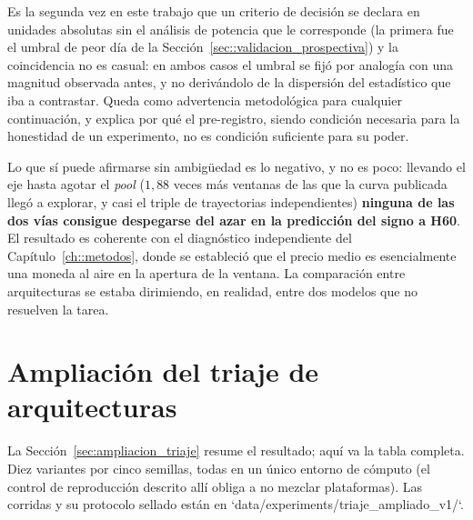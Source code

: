 Es la segunda vez en este trabajo que un criterio de decisión se declara en unidades
absolutas sin el análisis de potencia que le corresponde (la primera fue el umbral de peor
día de la Sección~\ref{sec::validacion_prospectiva}) y la coincidencia no es casual: en
ambos casos el umbral se fijó por analogía con una magnitud observada antes, y no
derivándolo de la dispersión del estadístico que iba a contrastar. Queda como advertencia
metodológica para cualquier continuación, y explica por qué el pre-registro, siendo
condición necesaria para la honestidad de un experimento, no es condición suficiente para
su poder.

Lo que sí puede afirmarse sin ambigüedad es lo negativo, y no es poco: llevando el eje
hasta agotar el \emph{pool} ($1{,}88$ veces más ventanas de las que la curva publicada
llegó a explorar, y casi el triple de trayectorias independientes) \textbf{ninguna de las
dos vías consigue despegarse del azar en la predicción del signo a H60}. El resultado es
coherente con el diagnóstico independiente del Capítulo~\ref{ch::metodos}, donde se
estableció que el precio medio es esencialmente una moneda al aire en la apertura de la
ventana. La comparación entre arquitecturas se estaba dirimiendo, en realidad, entre dos
modelos que no resuelven la tarea.


\section{Ampliación del triaje de arquitecturas}

La Sección~\ref{sec:ampliacion_triaje} resume el resultado; aquí va la tabla completa. Diez
variantes por cinco semillas, todas en un único entorno de cómputo (el control de
reproducción descrito allí obliga a no mezclar plataformas). Las corridas y su protocolo
sellado están en `data/experiments/triaje\_ampliado\_v1/`.

